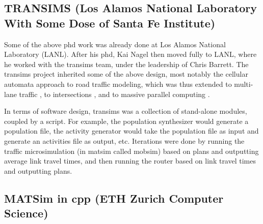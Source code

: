 \subsection{TRANSIMS (Los Alamos National Laboratory With Some Dose of Santa Fe Institute)}
\label{sec:history-lanl-phase}
Some of the above \gls{phd} work was already done at Los Alamos National Laboratory (LANL).  After his \gls{phd}, Kai Nagel then moved fully to LANL, where he worked with the \gls{transims} \citep[e.g.,][]{SmithEtc1995TRANSIMSSeattle} team, under the leadership of Chris Barrett.
%
The \gls{transims} project inherited some of the above design, most notably the cellular automata approach to road traffic modeling, which was thus extended to multi-lane traffic \citep{NagelWolfEtAl1998TwoLaneSystematic}, to intersections \citep{NagelEtc1997flow-char}, and to massive parallel computing \citep{NagelRickert2001parallel}.


In terms of software design, \gls{transims} was a collection of stand-alone modules, coupled by a script.  For example, the population synthesizer would generate a population file, the activity generator would take the population file as input and generate an activities file as output, etc.  Iterations were done by running 
the traffic \gls{microsimulation} (in \gls{matsim} called \gls{mobsim})
based on plans and outputting average link travel times, and then running the router based on link travel times and outputting plans.

\subsection{MATSim in \protect\gls{cpp} (ETH Zurich Computer Science)}
\label{sec:history-ethz-phase}


